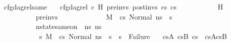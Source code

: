 \begin{isabellebody}
{\isafoldproof}%
%
\isadelimproof
\isanewline
%
\endisadelimproof
\isanewline
{}\isamarkupfalse%
\ cfg{\isacharunderscore}{\kern0pt}dag{\isacharunderscore}{\kern0pt}rel{\isacharunderscore}{\kern0pt}same{\isacharcolon}{\kern0pt}\isanewline
\ \ \ {\isachardoublequoteopen}cfg{\isacharunderscore}{\kern0pt}dag{\isacharunderscore}{\kern0pt}rel\ c\ H\ pre{\isacharunderscore}{\kern0pt}invs\ post{\isacharunderscore}{\kern0pt}invs\ cs{}\ cs{}{\isachardoublequoteclose}\ \isanewline
\ \ \ \ \ \ \ \ \ \ {\isachardoublequoteopen}H\ {\isacharequal}{\kern0pt}\ {\isacharbrackleft}{\kern0pt}{\isacharbrackright}{\kern0pt}{\isachardoublequoteclose}\ \isanewline
\ \ \ \ \ \ \ \ \ \ {\isachardoublequoteopen}pre{\isacharunderscore}{\kern0pt}invs\ {\isacharequal}{\kern0pt}\ {\isacharbrackleft}{\kern0pt}{\isacharbrackright}{\kern0pt}{\isachardoublequoteclose}\ \isanewline
\ \ \ \ \ \ \ \ \ \ {\isachardoublequoteopen}M{\isacharcomma}{\kern0pt}{\isasymLambda}{\isacharcomma}{\kern0pt}{\isasymGamma}{\isacharcomma}{\kern0pt}{\isasymOmega}\ {\isasymturnstile}\ {\isasymlangle}cs{}{\isacharcomma}{\kern0pt}\ Normal\ ns{}{\isasymrangle}\ {\isacharbrackleft}{\kern0pt}{\isasymrightarrow}{\isacharbrackright}{\kern0pt}\ s{\isacharprime}{\kern0pt}{\isachardoublequoteclose}\ \ \ \ \ \ \ \ \ \ \isanewline
\ \ \ \ \ \ \ \ \ \ {\isachardoublequoteopen}nstate{\isacharunderscore}{\kern0pt}same{\isacharunderscore}{\kern0pt}on\ {\isasymLambda}\ ns{}\ ns{}\ {\isacharbraceleft}{\kern0pt}{\isacharbraceright}{\kern0pt}{\isachardoublequoteclose}\ \isanewline
\ \ \ \ \ \ \ \ \ \ {\isachardoublequoteopen}{\isasymAnd}\ s{}{\isacharprime}{\kern0pt}{\isachardot}{\kern0pt}\ M{\isacharcomma}{\kern0pt}{\isasymLambda}{\isacharcomma}{\kern0pt}{\isasymGamma}{\isacharcomma}{\kern0pt}{\isasymOmega}\ {\isasymturnstile}\ {\isasymlangle}cs{}{\isacharcomma}{\kern0pt}\ Normal\ ns{}{\isasymrangle}\ {\isacharbrackleft}{\kern0pt}{\isasymrightarrow}{\isacharbrackright}{\kern0pt}\ s{}{\isacharprime}{\kern0pt}\ {\isasymLongrightarrow}\ s{}{\isacharprime}{\kern0pt}\ {\isasymnoteq}\ Failure{\isachardoublequoteclose}\isanewline
\ \ \ {\isachardoublequoteopen}{\isasymexists}cs{}A\ cs{}B{\isachardot}{\kern0pt}\ cs{}\ {\isacharequal}{\kern0pt}\ cs{}A{\isacharat}{\kern0pt}cs{}B\ {\isasymand}\ \ \ \isanewline

\end{isabellebody}
